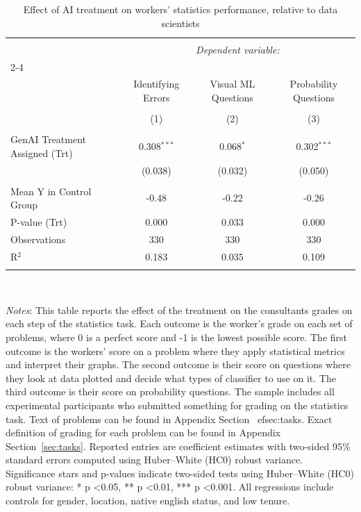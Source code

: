 
\begin{table}[!htbp] \centering 
  \caption{Effect of AI treatment on workers' statistics performance, relative to data scientists} 
  \label{tab:grades_detail_stats} 
\small 
\begin{tabular}{@{\extracolsep{-5pt}}lccc} 
\\[-1.8ex]\hline 
\hline \\[-1.8ex] 
 & \multicolumn{3}{c}{\textit{Dependent variable:}} \\ 
\cline{2-4} 
\\[-1.8ex] & Identifying Errors & Visual ML Questions & Probability Questions \\ 
\\[-1.8ex] & (1) & (2) & (3)\\ 
\hline \\[-1.8ex] 
 GenAI Treatment Assigned (Trt) & 0.308$^{***}$ & 0.068$^{*}$ & 0.302$^{***}$ \\ 
  & (0.038) & (0.032) & (0.050) \\ 
 \hline \\[-1.8ex] 
Mean Y in Control Group & -0.48 & -0.22 & -0.26 \\ 
P-value (Trt) & 0.000 & 0.033 & 0.000 \\ 
Observations & 330 & 330 & 330 \\ 
R$^{2}$ & 0.183 & 0.035 & 0.109 \\ 
\hline 
\hline \\[-1.8ex] 
\end{tabular}
\\
\begin{minipage}{\textwidth}
{\footnotesize \emph{Notes}: 
           This table reports the effect of the treatment on the consultants grades on each step of the statistics task. 
  Each outcome is the worker's grade on each set of problems, where 0 is a perfect score and -1 is the lowest possible score. 
  The first outcome is the workers' score on a problem where they apply statistical metrics and interpret their graphs.
   The second outcome is their score on questions where they look at data plotted and decide what types of classifier to use on it.
    The third outcome is their score on probability questions.
  The sample includes all experimental participants who submitted something for grading on the statistics task.
   Text of problems can be found in Appendix Section~
ef{sec:tasks}.
            Exact definition of grading for each problem can be found in Appendix Section~\ref{sec:tasks}.
            Reported entries are coefficient estimates with two-sided 95\% standard errors computed using Huber--White (HC0) robust variance.
            Significance stars and p-values indicate two-sided tests using Huber–White (HC0) robust variance:
* p \textless 0.05, ** p \textless 0.01, *** p \textless 0.001.
           All regressions include controls for gender, location, native english status, and low tenure.
          \starlanguage}
\end{minipage}
\end{table}
